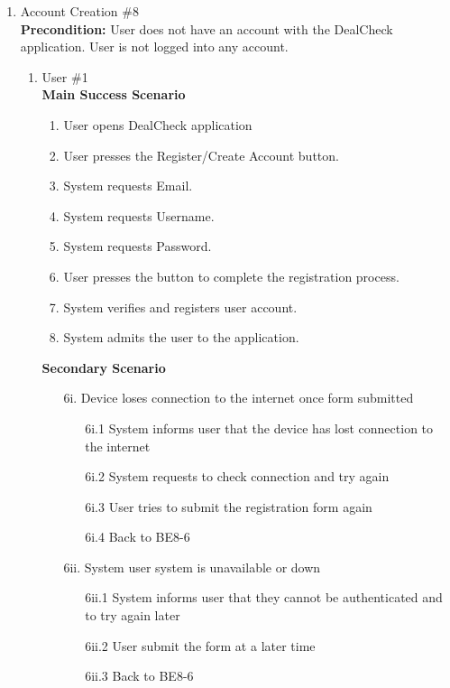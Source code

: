 \documentclass[]{article}
\begin{document}
\begin{enumerate}[{\bf {BE}1.}]
\item Account Creation \#8 \\
{\bf Precondition:} User does not have an account with the DealCheck application. User is not logged into any account.
\begin{enumerate}[{\bf VP1.}]
    \item User \#1 \\
    {\bf Main Success Scenario}
    \begin{enumerate}[1.]
        \item User opens DealCheck application
        \item User presses the Register/Create Account button.
        \item System requests Email.
        \item System requests Username.
        \item System requests Password.
        \item User presses the button to complete the registration process.
        \item System verifies and registers user account.
        \item System admits the user to the application.
        
    \end{enumerate}
    {\bf Secondary Scenario} \\
	\begin{enumerate}
		\item [6i.] Device loses connection to the internet once form submitted
		\begin{enumerate}
			\item [6i.1] System informs user that the device has lost connection to the internet
			\item [6i.2] System requests to check connection and try again
			\item [6i.3] User tries to submit the registration form again
			\item [6i.4] Back to BE8-6
		\end{enumerate}

		\item [6ii.] System user system is unavailable or down
		\begin{enumerate}
			\item [6ii.1] System informs user that they cannot be authenticated and to try again later
			\item [6ii.2] User submit the form at a later time
			\item [6ii.3] Back to BE8-6
		\end{enumerate}


\end{enumerate}
\end{enumerate}
\end{enumerate}
\end{document}
